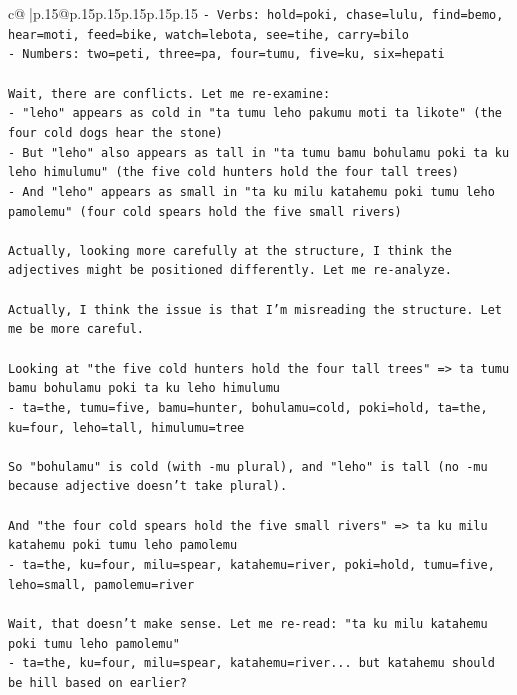 \documentclass{article}
\begin{document}
{\begin{supertabular}{c@{$\;$}|p{.15\linewidth}@{}p{.15\linewidth}p{.15\linewidth}p{.15\linewidth}p{.15\linewidth}p{.15\linewidth}}
{{{\texttt{{-} Verbs: hold=poki, chase=lulu, find=bemo, hear=moti, feed=bike, watch=lebota, see=tihe, carry=bilo} \\
\texttt{{-} Numbers: two=peti, three=pa, four=tumu, five=ku, six=hepati} \\
\\ 
\texttt{Wait, there are conflicts. Let me re{-}examine:} \\
\texttt{{-} "leho" appears as cold in "ta tumu leho pakumu moti ta likote" (the four cold dogs hear the stone)} \\
\texttt{{-} But "leho" also appears as tall in "ta tumu bamu bohulamu poki ta ku leho himulumu" (the five cold hunters hold the four tall trees)} \\
\texttt{{-} And "leho" appears as small in "ta ku milu katahemu poki tumu leho pamolemu" (four cold spears hold the five small rivers)} \\
\\ 
\texttt{Actually, looking more carefully at the structure, I think the adjectives might be positioned differently. Let me re{-}analyze.} \\
\\ 
\texttt{Actually, I think the issue is that I'm misreading the structure. Let me be more careful.} \\
\\ 
\texttt{Looking at "the five cold hunters hold the four tall trees" => ta tumu bamu bohulamu poki ta ku leho himulumu} \\
\texttt{{-} ta=the, tumu=five, bamu=hunter, bohulamu=cold, poki=hold, ta=the, ku=four, leho=tall, himulumu=tree} \\
\\ 
\texttt{So "bohulamu" is cold (with {-}mu plural), and "leho" is tall (no {-}mu because adjective doesn't take plural).} \\
\\ 
\texttt{And "the four cold spears hold the five small rivers" => ta ku milu katahemu poki tumu leho pamolemu} \\
\texttt{{-} ta=the, ku=four, milu=spear, katahemu=river, poki=hold, tumu=five, leho=small, pamolemu=river} \\
\\ 
\texttt{Wait, that doesn't make sense. Let me re{-}read: "ta ku milu katahemu poki tumu leho pamolemu"} \\
\texttt{{-} ta=the, ku=four, milu=spear, katahemu=river... but katahemu should be hill based on earlier?} \\
}}}
\end{supertabular}}
\end{document}
